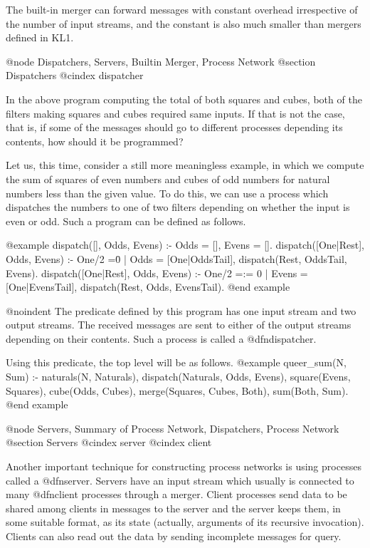 {The built-in merger can forward messages with constant overhead
irrespective of the number of input streams, and the constant is also
much smaller than mergers defined in KL1.

@node Dispatchers, Servers, Builtin Merger, Process Network
@section Dispatchers
@cindex dispatcher

In the above program computing the total of both squares and cubes, both
of the filters making squares and cubes required same inputs.  If that
is not the case, that is, if some of the messages should go to different
processes depending its contents, how should it be programmed?

Let us, this time, consider a still more meaningless example, in which
we compute the sum of squares of even numbers and cubes of odd numbers
for natural numbers less than the given value.  To do this, we can use
a process which dispatches the numbers to one of two filters depending
on whether the input is even or odd.  Such a program can be defined as
follows.

@example
dispatch([], Odds, Evens) :- Odds = [], Evens = [].
dispatch([One|Rest], Odds, Evens) :- One/2 =\= 0 |
    Odds = [One|OddsTail],
    dispatch(Rest, OddsTail, Evens).
dispatch([One|Rest], Odds, Evens) :- One/2 =:= 0 |
    Evens = [One|EvensTail],
    dispatch(Rest, Odds, EvensTail).
@end example

@noindent
The predicate defined by this program has one input stream and two
output streams.  The received messages are sent to either of the output
streams depending on their contents.  Such a process is called a
@dfn{dispatcher}.

Using this predicate, the top level will be as follows.
@example
queer_sum(N, Sum) :-
    naturals(N, Naturals),
    dispatch(Naturals, Odds, Evens),
    square(Evens, Squares),
    cube(Odds, Cubes),
    merge(Squares, Cubes, Both),
    sum(Both, Sum).
@end example

@node Servers, Summary of Process Network, Dispatchers, Process Network
@section Servers
@cindex server
@cindex client

Another important technique for constructing process networks is using
processes called a @dfn{server}.  Servers have an input stream which
usually is connected to many @dfn{client} processes through a merger.
Client processes send data to be shared among clients in messages to the
server and the server keeps them, in some suitable format, as its state
(actually, arguments of its recursive invocation).  Clients can also
read out the data by sending incomplete messages for query.

}
